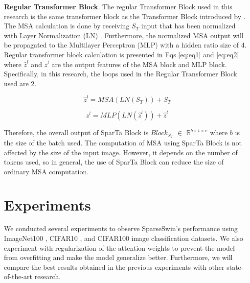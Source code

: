 \documentclass[runningheads]{llncs}
\begin{document}
\textbf{Regular Transformer Block}. The regular Transformer Block used in this research is the same transformer block as the Transformer Block introduced by \cite{vaswani2017attention}. The MSA calculation is done by receiving $S_T$ input that has been normalized with Layer Normalization (LN) \cite{ba2016layer}. Furthermore, the normalized MSA output will be propagated to the Multilayer Perceptron (MLP) with a hidden ratio size of 4. Regular transformer block calculation is presented in Eqs \ref{eq:eq1} and \ref{eq:eq2} where $\hat{z}^l$  and $z^l$ are the output features of the MSA block and MLP block. Specifically, in this research, the loops used in the Regular Transformer Block used are 2.

\begin{equation}
    \hat{z}^l = MSA(LN(S_T))+ S_T 
    \label{eq:eq1}
\end{equation}

\begin{equation}
    z^l = MLP(LN(\hat{z}^l))+ \hat{z}^l 
    \label{eq:eq2}
\end{equation}

Therefore, the overall output of SparTa Block is $Block_{S_T}$ $\in$ $\mathbb{R}^{b \times t \times e}$  where $b$ is the size of the batch used. The computation of MSA using SparTa Block is not affected by the size of the input image. However, it depends on the number of tokens used, so in general, the use of SparTa Block can reduce the size of ordinary MSA computation.

\section{Experiments}
\label{sec:experiments}
We conducted several experiments to observe SparseSwin's performance using ImageNet100 \cite{russakovsky2015imagenet}, CIFAR10 \cite{NIPS2012_c399862d}, and CIFAR100 \cite{NIPS2012_c399862d} image classification datasets. We also experiment with regularization of the attention weights to prevent the model from overfitting and make the model generalize better. Furthermore, we will compare the best results obtained in the previous experiments with other state-of-the-art research.
\end{document}
